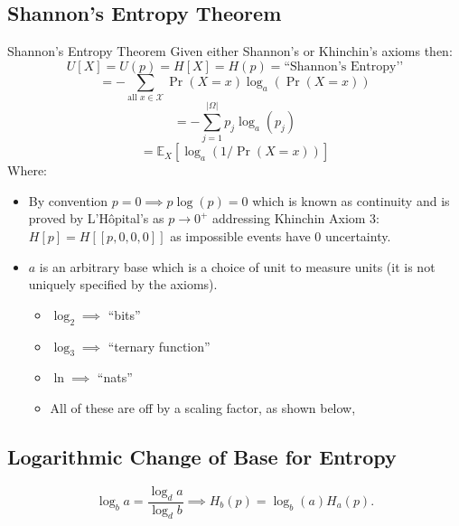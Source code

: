 \subsection{Shannon's Entropy Theorem}
\begin{defn}{Shannon's Entropy Theorem}
Given either Shannon’s or Khinchin’s axioms then:
\[ U[X]=U(p)=H[X]=H(p)=\text{``Shannon’s Entropy’’} \]
\[ = -\sum_{\text{all } x \in \mathcal{X}} \Pr(X=x) \log_a(\Pr(X=x)) \]
\[ = -\sum_{j=1}^{|\Omega|} p_j \log_a(p_j) \]
\[ = \mathbb{E}_X[\log_a(1/\Pr(X=x))] \]
Where:
\begin{itemize}
    \item By convention \( p=0 \implies p\log(p)=0 \) which is known as continuity and is proved by L’Hôpital’s as \( p \rightarrow 0^+ \) addressing Khinchin Axiom 3: \( H[p]=H[[p, 0, 0, 0]] \) as impossible events have 0 uncertainty.
    \item \( a \) is an arbitrary base which is a choice of unit to measure units (it is not uniquely specified by the axioms).
    \begin{itemize}
        \item \( \log_2 \implies \) “bits”
        \item \( \log_3 \implies \) “ternary function”
        \item \( \ln \implies \) “nats”
        \item All of these are off by a scaling factor, as shown below,
    \end{itemize}
\end{itemize}
\end{defn}

\subsection{Logarithmic Change of Base for Entropy}
$$
\log _b a=\frac{\log _d a}{\log _d b}
\implies 
H_b(p) = \log_b(a) H_a(p).
$$
